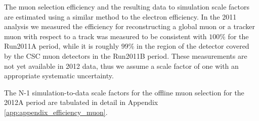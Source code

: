 
The muon selection efficiency and the resulting data to simulation
scale factors are estimated using a similar method to the electron efficiency. 
In the 2011 analysis we measured the efficiency for 
reconstructing a global muon or a tracker muon with respect
to a track was measured to be consistent with $100\%$ for the Run2011A period, 
while it is roughly $99\%$ in the region of the detector covered by the 
CSC muon detectors in the Run2011B period. These measurements are not yet available
in 2012 data, thus we assume a scale factor of one with an appropriate systematic
uncertainty.

The N-1 simulation-to-data scale factors for the offline muon selection
for the 2012A period are tabulated in detail in Appendix \ref{app:appendix_efficiency_muon}.


